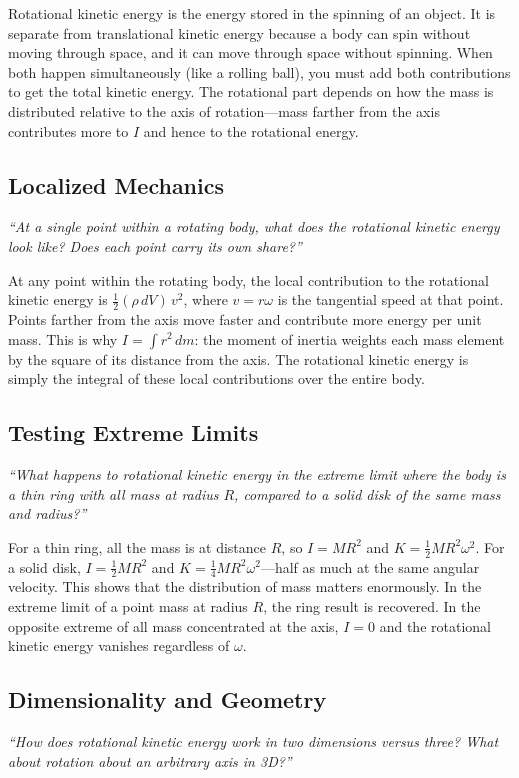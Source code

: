 Rotational kinetic energy is the energy stored in the spinning of an object. It is separate from translational kinetic energy because a body can spin without moving through space, and it can move through space without spinning. When both happen simultaneously (like a rolling ball), you must add both contributions to get the total kinetic energy. The rotational part depends on how the mass is distributed relative to the axis of rotation---mass farther from the axis contributes more to $I$ and hence to the rotational energy.

\subsection*{Localized Mechanics}
\textit{``At a single point within a rotating body, what does the rotational kinetic energy look like? Does each point carry its own share?''}

At any point within the rotating body, the local contribution to the rotational kinetic energy is $\frac{1}{2}(\rho\,dV)\,v^2$, where $v = r\omega$ is the tangential speed at that point. Points farther from the axis move faster and contribute more energy per unit mass. This is why $I = \int r^2\,dm$: the moment of inertia weights each mass element by the square of its distance from the axis. The rotational kinetic energy is simply the integral of these local contributions over the entire body.

\subsection*{Testing Extreme Limits}
\textit{``What happens to rotational kinetic energy in the extreme limit where the body is a thin ring with all mass at radius $R$, compared to a solid disk of the same mass and radius?''}

For a thin ring, all the mass is at distance $R$, so $I = MR^2$ and $K = \frac{1}{2}MR^2\omega^2$. For a solid disk, $I = \frac{1}{2}MR^2$ and $K = \frac{1}{4}MR^2\omega^2$---half as much at the same angular velocity. This shows that the distribution of mass matters enormously. In the extreme limit of a point mass at radius $R$, the ring result is recovered. In the opposite extreme of all mass concentrated at the axis, $I = 0$ and the rotational kinetic energy vanishes regardless of $\omega$.

\subsection*{Dimensionality and Geometry}
\textit{``How does rotational kinetic energy work in two dimensions versus three? What about rotation about an arbitrary axis in 3D?''}

